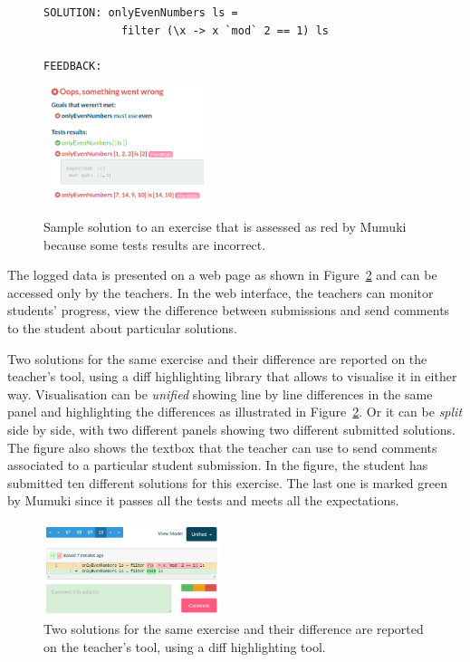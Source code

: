 \begin{figure}[H]
\begin{verbatim}
SOLUTION: onlyEvenNumbers ls = 
            filter (\x -> x `mod` 2 == 1) ls

FEEDBACK:
\end{verbatim}
    
\vspace*{-0.7cm}
\hspace*{1.5cm}\mbox{
    \includegraphics[width=0.4\textwidth]{screenshots/atheneum-error-tests-failed.png}
}
    
    \caption{Sample solution to an exercise that is assessed as red by Mumuki because some tests results are incorrect.\label{fig:error}}
\end{figure} 

The logged data is presented on a web page as shown in Figure~\ref{fig:classroom} and can be accessed only by the teachers. In the web interface, the teachers can monitor students' progress, view the difference between submissions and send comments to the student about particular solutions. 

Two solutions for the same exercise and their difference are reported on the teacher's tool, using a diff highlighting library that allows to visualise it in either way. Visualisation can be \emph{unified} showing line by line differences in the same panel and highlighting the differences as illustrated in Figure~\ref{fig:classroom}. Or it can be \emph{split} side by side, with two different panels showing two different submitted solutions. The figure also shows the textbox that the teacher can  use to send comments associated to a particular student submission. In the figure, the student has submitted ten different solutions for this exercise. The last one is marked green by Mumuki since it passes all the tests and meets all the expectations. 

\begin{figure}
    \includegraphics[width=0.46\textwidth]{screenshots/classroom-unified-diff.png}
    
    \caption{Two solutions for the same exercise and their difference are reported on the teacher's tool, using a diff highlighting tool.}
    \label{fig:classroom}
\end{figure}

